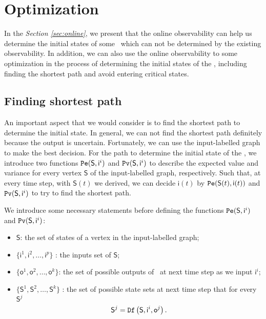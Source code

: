 \section{Optimization}
\label{sec:app}

In the {\em Section \ref{sec:online}}, we present that the online observability can help us determine the initial states of some \BCNs\ which can not be determined by the existing observability. In addition, we can also use the online observability to some optimization in the process of determining the initial states of the \BCNs, including finding the shortest path and avoid entering critical states. 

\subsection{Finding shortest path}
An important aspect that we would consider is to find the shortest path to determine the initial state. In general, we can not find the shortest path definitely because the output is uncertain. Fortunately, we can use the input-labelled graph to make the best decision. For the path to determine the initial state of the \BCNs, we introduce two functions ${\tt Pe}(\mathsf{S},\mathsf{ i}^{i})$ and ${\tt Pv}(\mathsf{S},\mathsf{ i}^{i})$ to describe the expected value and variance for every vertex $\mathsf{S}$ of the input-labelled graph, respectively. Such that, at every time step, with $\mathsf{S}(t)$ we derived, we can decide $\mathsf{i}(t)$ by ${\tt Pe}(\mathsf{S}(t),\mathsf{ i}(t))$ and ${\tt Pv}(\mathsf{S},\mathsf{ i}^{i})$ to try to find the shortest path. 

We introduce some necessary statements before defining the functions ${\tt Pe}(\mathsf{S},\mathsf{ i}^{i})$ and ${\tt Pv}(\mathsf{S},\mathsf{ i}^{i})$:
\begin{itemize}
  \item $\mathsf{S}$: the set of states of a vertex in the input-labelled graph;
  \item $\{\mathsf{ i}^{1},\mathsf{ i}^{2},\ldots, \mathsf{ i}^{p}\}$ : the inputs set of $\mathsf{S}$;
  \item $\{\mathsf{o}^1,\mathsf{o}^2,\ldots,\mathsf{o}^k\}$: the set of possible outputs of \BCN\ at next time step as we input $\mathsf{ i}^{i}$;
 \item $\{\mathsf{S}^{1},\mathsf{S}^{2},\ldots, \mathsf{S}^{k}\}$ : the set of possible state sets at next time step that for every $\mathsf{S}^{j}$ \[\mathsf{S}^{j}={\tt Df}\left(\mathsf{S},\mathsf{i}^{i},\mathsf{o}^{j}\right).\] 
  
\end{itemize} 

